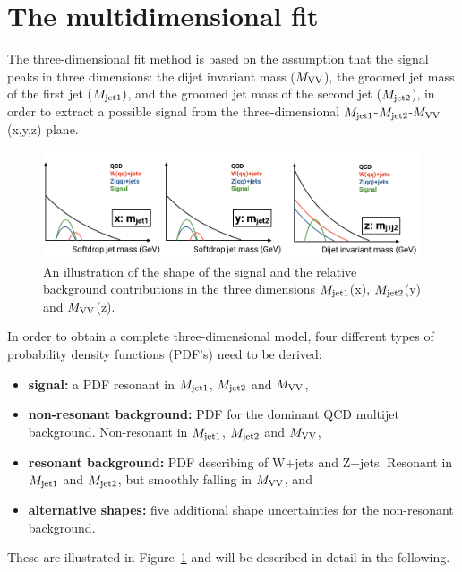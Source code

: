 \section{The multidimensional fit}
\label{sec:searchIII:fit3d}
The three-dimensional fit method is based on the assumption that the signal peaks in three dimensions: the dijet invariant mass ($M_{\rm VV}$), the groomed jet mass of the first jet ($M_{\rm jet1})$, and the groomed jet mass of the second jet ($M_{\rm jet2}$), in order to extract a possible signal from the three-dimensional $M_{\rm jet1}$-$M_{\rm jet2}$-$M_{\rm VV}$ (x,y,z) plane.\newline
\begin{figure}[h!]
\centering
\includegraphics[width=0.99\textwidth]{figures/analysis/search3/misc/3Dfit.png}
\caption{An illustration of the shape of the signal and the relative background contributions in the three dimensions $M_{\rm jet1}$(x), $M_{\rm jet2}$(y) and $M_{\rm VV}$(z). }
\label{fig:searchIII:3Dfit}
\end{figure}
\noindent In order to obtain a complete three-dimensional model, four different types of probability density functions (PDF's) need to be derived:
\begin{itemize}
   \itemsep0em
  \item \textbf{signal:} a PDF resonant in $M_{\rm jet1}$, $M_{\rm jet2}$ and $M_{\rm VV}$,
  \item \textbf{non-resonant background:} PDF for the dominant QCD multijet background. Non-resonant in $M_{\rm jet1}$, $M_{\rm jet2}$ and $M_{\rm VV}$,
  \item \textbf{resonant background:} PDF describing of W+jets and Z+jets. Resonant in $M_{\rm jet1}$ and $M_{\rm jet2}$, but smoothly falling in $M_{\rm VV}$, and
  \item \textbf{alternative shapes:} five additional shape uncertainties for the non-resonant background.
\end{itemize}
These are illustrated in Figure~\ref{fig:searchIII:3Dfit} and will be described in detail in the following.
\clearpage

